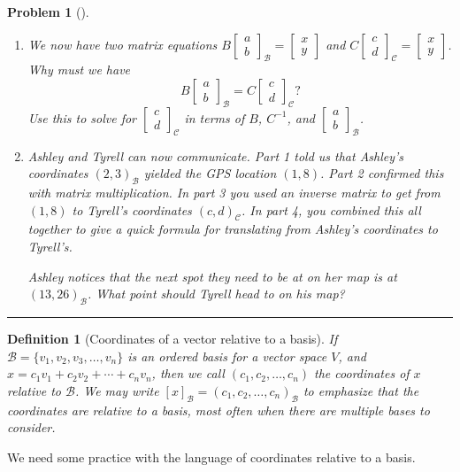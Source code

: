 \documentclass[letterpaper,oneside]{book}%
\theoremstyle{plain}
\theoremstyle{box}
\newtheorem{definition}[theorem]{Definition}
\theoremstyle{problem}
\newtheorem{problemnum}{Problem}[chapter]
\newenvironment{problem}[1][]{\begin{problemnum}[#1]}{\end{problemnum}\nopagebreak\hrule\bigskip}
\newcommand{\bvec}[1]{\begin{bmatrix} #1 \end{bmatrix}}
\begin{document}
\begin{problem}
\begin{enumerate}
 \item We now have two matrix equations $B\bvec{a\\b}_{\mathscr{B}}=\bvec{x\\y}$ and $C\bvec{c\\d}_{\mathscr{C}}=\bvec{x\\y}$. Why must we have 
 $$B\bvec{a\\b}_{\mathscr{B}}=C\bvec{c\\d}_{\mathscr{C}}?$$
 Use this to solve for $\bvec{c\\d}_{\mathscr{C}}$ in terms of $B$, $C^{-1}$, and $\bvec{a\\b}_{\mathscr{B}}$. 
 \item Ashley and Tyrell can now communicate. Part 1 told us that Ashley's coordinates $(2,3)_{\mathscr{B}}$ yielded the GPS location $(1,8)$.  Part 2 confirmed this with matrix multiplication. In part 3 you used an inverse matrix to get from $(1,8)$ to Tyrell's coordinates $(c,d)_{\mathscr{C}}$. In part 4, you combined this all together to give a quick formula for translating from Ashley's coordinates to Tyrell's. 
 
 Ashley notices that the next spot they need to be at on her map is at $(13,26)_{\mathscr{B}}$.  What point should Tyrell head to on his map?
\end{enumerate}
\end{problem}

\begin{definition}[Coordinates of a vector relative to a basis]
 If $\mathscr{B} = \{v_1,v_2,v_3,\ldots,v_n\}$ is an ordered basis for a vector space $V$, and $x = c_1v_1+c_2v_2+\cdots+c_nv_n$, then we call $(c_1,c_2,\ldots,c_n)$ the coordinates of $x$ relative to $\mathscr{B}$. We may write $[x]_{\mathscr{B}}=(c_1,c_2,\ldots,c_n)_{\mathscr{B}}$ to emphasize that the coordinates are relative to a basis, most often when there are multiple bases to consider. 
\end{definition}


We need some practice with the language of coordinates relative to a basis. 
\end{document}
